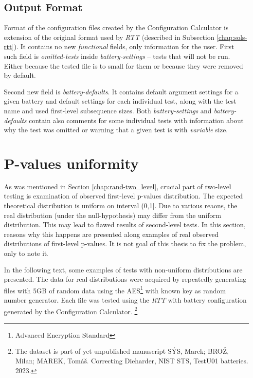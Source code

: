 \documentclass[
  digital,     %
  oneside,     %
  nosansbold,  %
  nocolorbold, %
  nolof,         %
  nolot,         %
]{fithesis4}
\begin{document}
\subsection{Output Format}
Format of the configuration files created by the Configuration Calculator is extension of the original format used by \emph{RTT} (described in Subsection \ref{chap:sols-rtt}). It contains no new \emph{functional} fields, only information for the user. First such field is \emph{omitted-tests} inside \emph{battery-settings} -- tests that will not be run. Either because the tested file is to small for them or because they were removed by default.

Second new field is \emph{battery-defaults}. It contains default argument settings for a given battery and default settings for each individual test, along with the test name and used first-level subsequence sizes. Both \emph{battery-settings} and \emph{battery-defaults} contain also comments for some individual tests with information about why the test was omitted or warning that a given test is with \emph{variable} size.



\section{P-values uniformity} \label{chap:analysis-uniform}
As was mentioned in Section \ref{chap:rand-two_level}, crucial part of two-level testing is examination of observed first-level p-values distribution. The expected theoretical distribution is uniform on interval (0,1]. \cite[p.~14]{bad_day} Due to various reaons, the real distribution (under the null-hypothesis) may differ from the uniform distribution. This may lead to flawed results of second-level tests. In this section, reasons why this happens are presented along examples of real observed distributions of first-level p-values. It is not goal of this thesis to fix the problem, only to note it.

In the following text, some examples of tests with non-uniform distributions are presented. The data for real distributions were acquired by repeatedly generating files with 5GB of random data using the AES\footnote{Advanced Encryption Standard} with known key as random number generator. Each file was tested using the \emph{RTT} with battery configuration generated by the Configuration Calculator. \footnote{The dataset is part of yet unpublished manuscript SÝS, Marek; BROŽ, Milan; MAREK, Tomáš. Correcting Dieharder, NIST STS, TestU01 batteries. 2023.}
\end{document}
